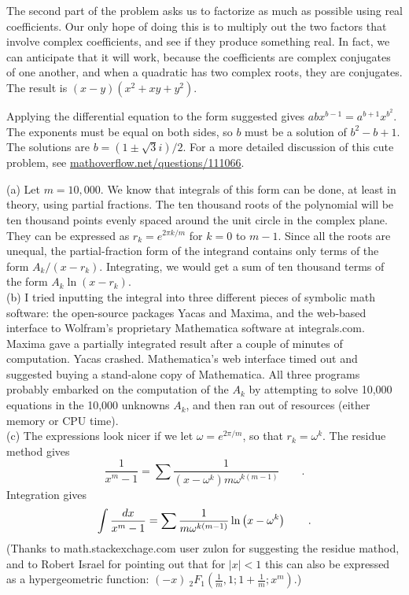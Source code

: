 The second part of the problem asks us to factorize as much as possible using real coefficients.
Our only hope of doing this is to multiply out the two factors that involve complex coefficients,
and see if they produce something real. In fact, we can anticipate that it will work, because
the coefficients are complex conjugates of one another, and when a quadratic has two complex
roots, they are conjugates. The result is $(x-y)(x^2+xy+y^2)$.

Applying the differential equation to the form suggested gives $abx^{b-1}=a^{b+1}x^{b^2}$.
The exponents must be equal on both sides, so $b$ must be a solution of $b^2-b+1$. The solutions
are $b=(1\pm\sqrt{3}i)/2$. For a more detailed discussion of this cute problem, see
\url{mathoverflow.net/questions/111066}.

(a) Let $m=10,000$. We know that integrals of this form can be done, at least in theory, using partial fractions.
The ten thousand roots of the polynomial will be ten thousand points evenly spaced around
the unit circle in the complex plane. They can be expressed as $r_k=e^{2\pi k/m}$ for $k=0$ to $m-1$.
Since all the roots are unequal, the partial-fraction form of the integrand contains only terms
of the form $A_k/(x-r_k)$. Integrating, we would get a sum of ten thousand terms of the form
$A_k\ln(x-r_k)$.\\
(b) I tried inputting the integral into three different pieces of symbolic
math software: the open-source packages Yacas and Maxima, and the web-based interface to
Wolfram's proprietary Mathematica software at integrals.com. Maxima gave a partially integrated result after a couple
of minutes of computation. Yacas crashed. Mathematica's web interface timed out and suggested
buying a stand-alone copy of Mathematica. All three programs probably embarked on the computation
of the $A_k$ by attempting to solve 10,000 equations in the 10,000 unknowns $A_k$, and then ran out
of resources (either memory or CPU time).\\
(c) The expressions look nicer if we let $\omega=e^{2\pi/m}$, so that $r_k=\omega^k$. The residue method gives
\begin{equation*}
  \frac{1}{x^m-1} = \sum \frac{1}{(x-\omega^k)m \omega^{k(m-1)}} \qquad .
\end{equation*}
Integration gives
\begin{equation*}
  \int \frac{\mathop{d\!} x}{x^m-1} = \sum \frac{1}{m \omega^{k(m-1)}}\ln\left(x-\omega^k\right) \qquad .
\end{equation*}
(Thanks to math.stackexchage.com user zulon for suggesting the residue mathod, and to
Robert Israel for pointing out that for $|x|<1$ this can also be expressed as a hypergeometric function:
$(- x)\ {}_2F_1\left(\frac{1}{m},1; 1+\frac{1}{m}; x^m\right)$.)
